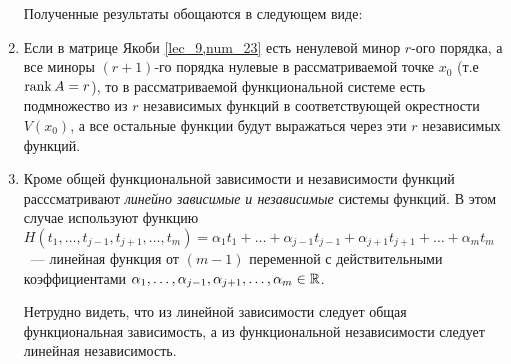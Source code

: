 \documentclass[../../main.tex]{subfiles}
\begin{document}
\begin{rems}

	\begin{enumerate}
		Полученные результаты обощаются в следующем виде:
		
		\item
		Если в матрице Якоби \eqref{lec_9,num_23} есть ненулевой 
		минор $r$-ого порядка, а все миноры $(r+1)$-го 
		порядка нулевые 
		в рассматриваемой точке $x_0$ (т.е $\operatorname{rank} A = r$), то в 
		рассматриваемой функциональной системе есть подмножество 
		из $r$ независимых функций в соответствующей окрестности 
		$V(x_0)$, а все остальные функции будут выражаться через 
		эти $r$ независимых функций.
		
		\item
		Кроме общей функциональной зависимости и независимости 
		функций расссматривают \emph{линейно зависимые и независимые} 
		системы функций. В этом случае используют функцию 
		$H( t_1, \ldots, t_{j-1}, t_{j+1}, \ldots, t_m 
		) = \alpha_1 t_1 + \ldots + \alpha_{j-1} t_{j-1} + 
		\alpha_{j+1} t_{j+1} + \ldots + \alpha_m t_m$~--- 
		линейная функция от $(m-1)$ переменной с действительными 
		коэффициентами $\alpha_1, \ldots, \alpha_{j-1}, 
		\alpha_{j+1}, \ldots, \alpha_m \in \mathbb{R}$.
	
		Нетрудно видеть, что из линейной зависимости следует 
		общая функциональная зависимость, а из функциональной 
		независимости следует линейная независимость.
	\end{enumerate}
\end{rems}
\end{document}
